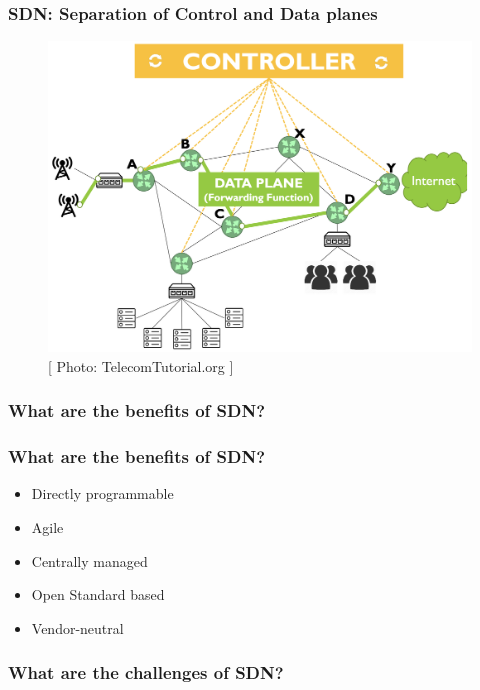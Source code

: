 \documentclass{beamer}
\begin{document}
\begin{frame}
  \frametitle{SDN: Separation of Control and Data planes}
  \begin{figure}
    \begin{center}
      \includegraphics[scale=0.275]{images/sdn-9}
    \end{center}
    \vspace{-0.05cm}
    \caption{\small{[ Photo: TelecomTutorial.org ]}}
  \end{figure}
\end{frame}

\begin{frame}
  \frametitle{What are the benefits of SDN?}
\end{frame}

\begin{frame}
  \frametitle{What are the benefits of SDN?}
      \begin{itemize}[<+->]
      \item[\ding{219}] Directly programmable
      \item[\ding{219}] Agile
      \item [\ding{219}] Centrally managed
      \item [\ding{219}] Open Standard based
      \item [\ding{219}] Vendor-neutral
    \end{itemize}
\end{frame}
\begin{frame}
  \frametitle{What are the challenges of SDN?}
\end{frame}
\end{document}
